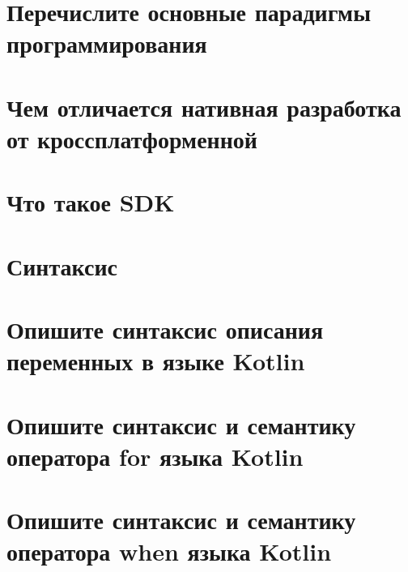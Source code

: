 \documentclass[12pt]{article}
\begin{document}
\section*{Перечислите основные парадигмы программирования}
\begin{enumerate}[leftmargin=*]
\end{enumerate}
\vspace{2mm}
\section*{Чем отличается нативная разработка от кроссплатформенной}
\begin{enumerate}[leftmargin=*]
\end{enumerate}
\vspace{2mm}
\section*{Что такое SDK}
\begin{enumerate}[leftmargin=*]
\end{enumerate}
\vspace{2mm}
\section*{Синтаксис}
\begin{enumerate}[leftmargin=*]
\end{enumerate}
\vspace{2mm}
\section*{Опишите синтаксис описания переменных в языке Kotlin}
\begin{enumerate}[leftmargin=*]
\end{enumerate}
\vspace{2mm}
\section*{Опишите синтаксис и семантику оператора for языка Kotlin}
\begin{enumerate}[leftmargin=*]
\end{enumerate}
\vspace{2mm}
\section*{Опишите синтаксис и семантику оператора when языка Kotlin}
\begin{enumerate}[leftmargin=*]
\end{enumerate}
\vspace{2mm}
\end{document}

